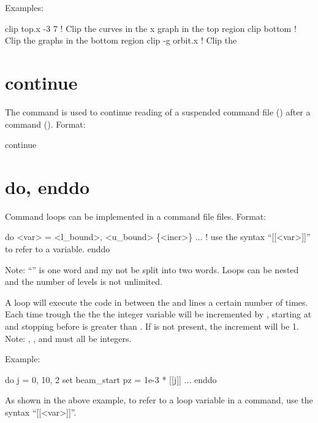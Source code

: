 Examples:
\begin{example}
  clip top.x -3  7  ! Clip the curves in the x graph in the top region
  clip bottom       ! Clip the graphs in the bottom region
  clip -g orbit.x   ! Clip the 
\end{example}

\section{continue}
\label{s:continue}

The  command is used to continue reading of a suspended command file
() after a  command (). Format:
\begin{example}
  continue
\end{example}

\section{do, enddo}
\label{s:do}

Command loops can be implemented in a command file files. Format:
\begin{example}
  do <var> = <l_bound>, <u_bound> \{<incr>\}
    ...   ! use the syntax ``[[<var>]]'' to refer to a variable.
  enddo
\end{example}
Note: ``'' is one word and my not be split into two words.
Loops can be nested and the number of levels is not unlimited. 

A loop will execute the code in between the  and  lines a certain number of
times. Each time trough the the the integer variable  will be incremented by ,
starting at  and stopping before  is greater than . If
 is not present, the increment will be 1. Note: , , and
 must all be integers.

Example:
\begin{example}
  do j = 0, 10, 2
    set beam_start pz = 1e-3 * [[j]]
    ...
  enddo
\end{example}
As shown in the above example, to refer to a loop variable in a command, use the syntax ``[[<var>]]''.

